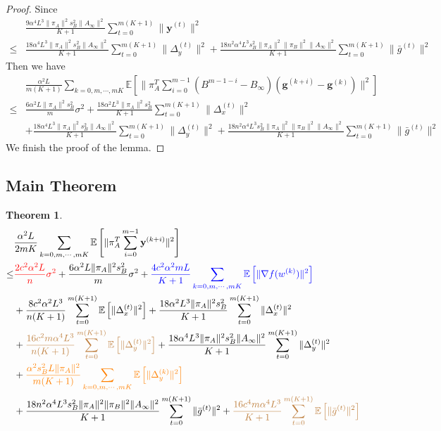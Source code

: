 \documentclass{article}
\newtheorem{theorem}{Theorem}
\newcommand{\vg}{{\mathbf{g}}}
\newcommand{\vy}{{\mathbf{y}}}
\newcommand{\EE}[1]{\mathbb{E}\left[#1\right]}
\newcommand{\norm}[1]{\| #1 \|}
\begin{document}
\begin{proof}
  Since 
  \begin{align*}
    &\frac{9\alpha^4L^3\norm{\pi_A}^2s_B^2\norm{A_{\infty}}^2}{K+1}\sum_{t=0}^{m(K+1)}\norm{\vy^{(t)}}^2\\\leq&\frac{18\alpha^4L^3\norm{\pi_A}^2s_B^2\norm{A_{\infty}}^2}{ K+1}\sum_{t=0}^{m(K+1)}\norm{\Delta_y^{(t)}}^2+\frac{18n^2\alpha^4L^3s_B^2\norm{\pi_A}^2\norm{\pi_B}^2\norm{A_{\infty}}^2}{ K+1}\sum_{t=0}^{m(K+1)}\norm{\bar{g}^{(t)}}^2
  \end{align*}
  Then we have
  \begin{align*}
    &\frac{\alpha^2L}{m(K+1)}\sum_{k=0,m,\cdots,mK}\EE{\norm{\pi_A^{T}\sum_{i=0}^{m-1}(B^{m-1-i}-B_{\infty})(\vg^{(k+i)}-\vg^{(k)})}^2}\\
    \leq& \frac{6\alpha^2L\norm{\pi_A}^2s_B^2}{m}\sigma^2+\frac{18\alpha^2L^3\norm{\pi_A}^2s_B^2}{ K+1}\sum_{t=0}^{m(K+1)}\norm{\Delta_x^{(t)}}^2\\&+\frac{18\alpha^4L^3\norm{\pi_A}^2s_B^2\norm{A_{\infty}}^2}{ K+1}\sum_{t=0}^{m(K+1)}\norm{\Delta_y^{(t)}}^2+\frac{18n^2\alpha^4L^3s_B^2\norm{\pi_A}^2\norm{\pi_B}^2\norm{A_{\infty}}^2}{ K+1}\sum_{t=0}^{m(K+1)}\norm{\bar{g}^{(t)}}^2
  \end{align*}
  We finish the proof of the lemma.
\end{proof}

\subsection{Main Theorem}

\begin{theorem}
  \begin{align*}
    &\frac{\alpha^2 L}{2mK}\sum_{k=0,m,\cdots,mK}\EE{\norm{\pi_A^T\sum_{i=0}^{m-1}\vy^{(k+i)}}^2}\\
    \leq&\textcolor{red}{ \frac{2c^2\alpha^2L}{n}\sigma^2}+\frac{6\alpha^2L\norm{\pi_A}^2s_B^2}{m}\sigma^2+ \textcolor{blue}{\frac{4c^2\alpha^2mL}{K+1}\sum_{k=0,m,\cdots,mK}\EE{\norm{\nabla f(w^{(k)})}^2}}\\&+\frac{8c^2\alpha^2L^3}{n(K+1)}\sum_{t=0}^{m(K+1)}\EE{\norm{\Delta_x^{(t)}}^2}+\frac{18\alpha^2L^3\norm{\pi_A}^2s_B^2}{ K+1}\sum_{t=0}^{m(K+1)}\norm{\Delta_x^{(t)}}^2\\&+\textcolor{brown}{\frac{16c^2m\alpha^4L^3}{n(K+1)}\sum_{t=0}^{m(K+1)}\EE{\norm{\Delta_y^{(t)}}^2}}+\frac{18\alpha^4L^3\norm{\pi_A}^2s_B^2\norm{A_{\infty}}^2}{ K+1}\sum_{t=0}^{m(K+1)}\norm{\Delta_y^{(t)}}^2
    \\&+\textcolor{orange}{\frac{\alpha^2s_B^2L\norm{\pi_A}^2}{m(K+1)}\sum_{k=0,m,\cdots,mK}\EE{\norm{\Delta_y^{(k)}}^2}}
    \\&+\frac{18n^2\alpha^4L^3s_B^2\norm{\pi_A}^2\norm{\pi_B}^2\norm{A_{\infty}}^2}{ K+1}\sum_{t=0}^{m(K+1)}\norm{\bar{g}^{(t)}}^2+\textcolor{brown}{\frac{16c^4m\alpha^4L^3}{K+1}\sum_{t=0}^{m(K+1)}\EE{\norm{\bar{g}^{(t)}}^2}}
  \end{align*}
\end{theorem}
\end{document}
